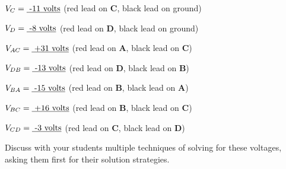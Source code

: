 $V_C = \hbox{\underbar{ -11 volts}}$ (red lead on {\bf C}, black lead on ground)

\vskip 5pt

$V_D = \hbox{\underbar{ -8 volts}}$ (red lead on {\bf D}, black lead on ground)

\vskip 20pt

\goodbreak

$V_{AC} = \hbox{\underbar{ +31 volts}}$ (red lead on {\bf A}, black lead on {\bf C})

\vskip 5pt

$V_{DB} = \hbox{\underbar{ -13 volts}}$ (red lead on {\bf D}, black lead on {\bf B})

\vskip 5pt

$V_{BA} = \hbox{\underbar{ -15 volts}}$ (red lead on {\bf B}, black lead on {\bf A})

\vskip 5pt

$V_{BC} = \hbox{\underbar{ +16 volts}}$ (red lead on {\bf B}, black lead on {\bf C})

\vskip 5pt

$V_{CD} = \hbox{\underbar{ -3 volts}}$ (red lead on {\bf C}, black lead on {\bf D})







Discuss with your students multiple techniques of solving for these voltages, asking them first for their solution strategies.




